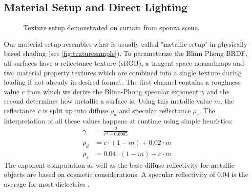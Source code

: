 \documentclass[thesis.tex]{subfiles}
\begin{document}
\subsection{Material Setup and Direct Lighting}
\begin{figure}[h!]
\centering
{}
\caption{Texture setup demonstrated on curtain from sponza scene.}
\label{fig:texturesample}
\end{figure}
Our material setup resembles what is usually called "metallic setup" in physically based shading (see \autoref{fig:texturesample}).
To parameterize the Blinn Phong BRDF, all surfaces have a reflectance texture (sRGB), a tangent space normalmaps and two material property textures which are combined into a single texture during loading if not already in desired format.
The first channel contains a roughness value $r$ from which we derive the Blinn-Phong specular exponent $\gamma$ and the second determines how metallic a surface is:
Using this metallic value $m$, the reflectance $c$ is split up into diffuse $\rho_d$ and specular reflectance $\rho_s$.
The interpretation of all these values happens at runtime using simple heuristics:
\begin{align}
\gamma &= \frac{2}{r^4 + 0.0005}\\
\rho_d &= c \cdot (1-m) + 0.02 \cdot m\\
\rho_s &= 0.04 \cdot (1-m) + c \cdot m
\end{align}
The exponent computation as well as the base diffuse reflectivity for metallic objects are based on cosmetic considerations.
A specular reflectivity of 0.04 is the average for most dielectrics \cite{bib:natypbr}.
\end{document}
